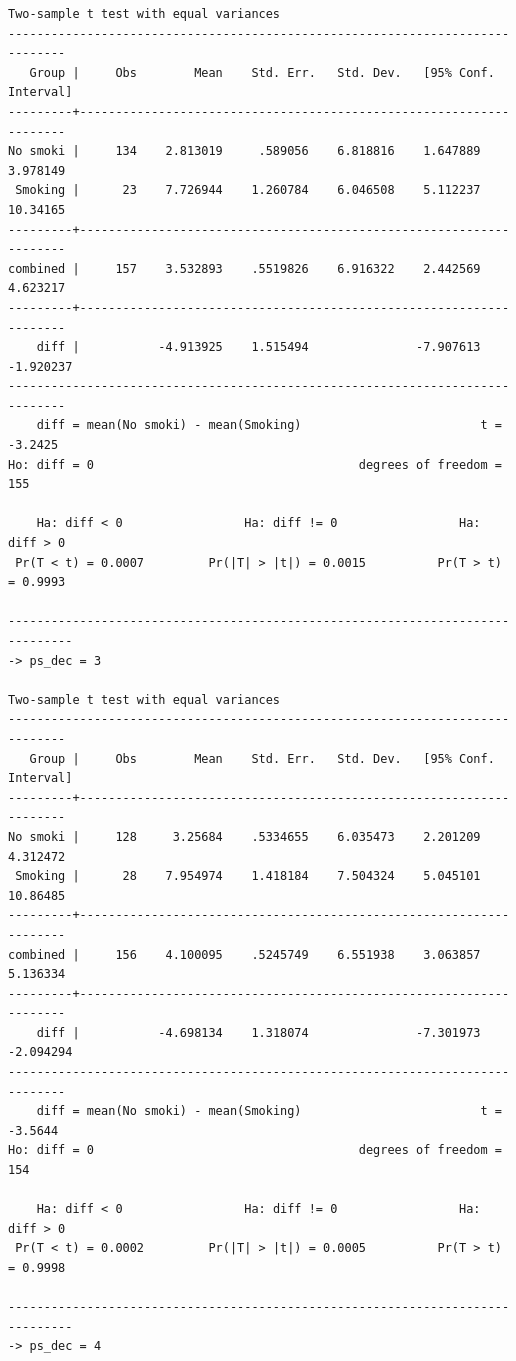 \documentclass[
  10pt,
]{book}
\begin{document}
\begin{verbatim}
Two-sample t test with equal variances
------------------------------------------------------------------------------
   Group |     Obs        Mean    Std. Err.   Std. Dev.   [95% Conf. Interval]
---------+--------------------------------------------------------------------
No smoki |     134    2.813019     .589056    6.818816    1.647889    3.978149
 Smoking |      23    7.726944    1.260784    6.046508    5.112237    10.34165
---------+--------------------------------------------------------------------
combined |     157    3.532893    .5519826    6.916322    2.442569    4.623217
---------+--------------------------------------------------------------------
    diff |           -4.913925    1.515494               -7.907613   -1.920237
------------------------------------------------------------------------------
    diff = mean(No smoki) - mean(Smoking)                         t =  -3.2425
Ho: diff = 0                                     degrees of freedom =      155

    Ha: diff < 0                 Ha: diff != 0                 Ha: diff > 0
 Pr(T < t) = 0.0007         Pr(|T| > |t|) = 0.0015          Pr(T > t) = 0.9993

-------------------------------------------------------------------------------
-> ps_dec = 3

Two-sample t test with equal variances
------------------------------------------------------------------------------
   Group |     Obs        Mean    Std. Err.   Std. Dev.   [95% Conf. Interval]
---------+--------------------------------------------------------------------
No smoki |     128     3.25684    .5334655    6.035473    2.201209    4.312472
 Smoking |      28    7.954974    1.418184    7.504324    5.045101    10.86485
---------+--------------------------------------------------------------------
combined |     156    4.100095    .5245749    6.551938    3.063857    5.136334
---------+--------------------------------------------------------------------
    diff |           -4.698134    1.318074               -7.301973   -2.094294
------------------------------------------------------------------------------
    diff = mean(No smoki) - mean(Smoking)                         t =  -3.5644
Ho: diff = 0                                     degrees of freedom =      154

    Ha: diff < 0                 Ha: diff != 0                 Ha: diff > 0
 Pr(T < t) = 0.0002         Pr(|T| > |t|) = 0.0005          Pr(T > t) = 0.9998

-------------------------------------------------------------------------------
-> ps_dec = 4


\end{verbatim}
\end{document}
